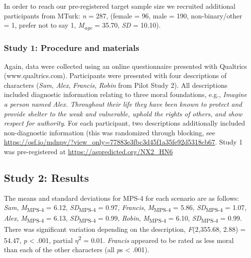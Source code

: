 \documentclass[
  american,
  man,floatsintext]{apa7}
\begin{document}
In order to reach our pre-registered target sample size we recruited additional participants from MTurk: \emph{n} = 287, (female = 96, male = 190, non-binary/other = 1, prefer not to say 1, \emph{M\textsubscript{age}} = 35.70, \emph{SD} = 10.10).

\hypertarget{study-1-procedure-and-materials-1}{%
\subsubsection{Study 1: Procedure and materials}\label{study-1-procedure-and-materials-1}}

Again, data were collected using an online questionnaire presented with Qualtrics (www.qualtrics.com). Participants were presented with four descriptions of characters (\emph{Sam}, \emph{Alex}, \emph{Francis}, \emph{Robin} from Pilot Study 2). All descriptions included diagnostic information relating to three moral foundations, e.g., \emph{Imagine a person named Alex. Throughout their life they have been known to protect and provide shelter to the weak and vulnerable, uphold the rights of others, and show respect for authority}. For each participant, two descriptions additionally included non-diagnostic information (this was randomized through blocking, see \color{blue}\url{https://osf.io/mdnpv/?view_only=77883e3fbc3d45f1a35fe92d5318cb67}\color{black}. Study 1 was pre-registered at \color{blue}\url{https://aspredicted.org/NX2_HN6}\color{black}

\hypertarget{study-2-results}{%
\subsection{Study 2: Results}\label{study-2-results}}

The means and standard deviations for MPS-4 for each scenario are as follows:
\emph{Sam},
\emph{M}\textsubscript{MPS-4} = 6.12, \emph{SD}\textsubscript{MPS-4} = 0.97,
\emph{Francis},
\emph{M}\textsubscript{MPS-4} = 5.86, \emph{SD}\textsubscript{MPS-4} = 1.07,
\emph{Alex},
\emph{M}\textsubscript{MPS-4} = 6.13, \emph{SD}\textsubscript{MPS-4} = 0.99,
\emph{Robin},
\emph{M}\textsubscript{MPS-4} = 6.10, \emph{SD}\textsubscript{MPS-4} = 0.99. There was significant variation depending on the description, \emph{F}(2,355.68, 2.88) = 54.47, \emph{p} \textless{} .001, partial \(\eta\)\textsuperscript{2} = 0.01. \emph{Francis} appeared to be rated as less moral than each of the other characters (all \emph{p}s \textless{} .001).
\end{document}
